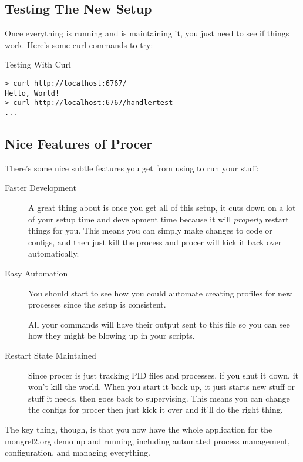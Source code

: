 \subsection{Testing The New Setup}

Once everything is running and  is maintaining it, you
just need to see if things work.  Here's some curl commands to try:

\begin{code}{Testing With Curl}
\begin{Verbatim}
> curl http://localhost:6767/
Hello, World!
> curl http://localhost:6767/handlertest
...
\end{Verbatim}
\end{code}


\subsection{Nice Features of Procer}

There's some nice subtle features you get from using 
to run your stuff:

\begin{description}
\item [Faster Development]  A great thing about  is once you get all of this setup,
    it cuts down on a lot of your setup time and development time because
    it will \emph{properly} restart things for you.  This means you can
    simply make changes to code or configs, and then just kill the process and
    procer will kick it back over automatically.
\item [Easy Automation]  You should start to see how you could automate creating
    profiles for new processes since the setup is consistent.
  \item []  All your commands will have their output sent to
    this file so you can see how they might be blowing up in your scripts.
\item [Restart State Maintained]  Since procer is just tracking PID files and
    processes, if you shut it down, it won't kill the world.  When you start
    it back up, it just starts new stuff or stuff it needs, then goes back to
    supervising.  This means you can change the configs for procer then just
    kick it over and it'll do the right thing.
\end{description}

The key thing, though, is that you now have the whole application for
the mongrel2.org demo up and running, including automated process management,
configuration, and managing everything.

